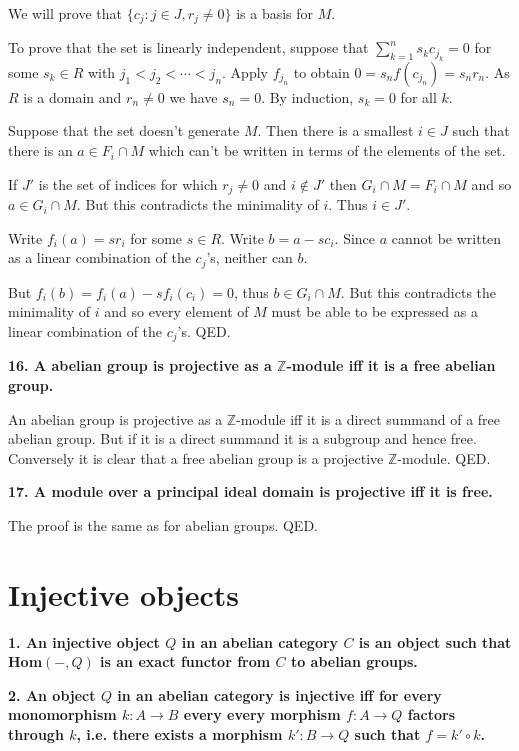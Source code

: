\documentclass[12pt]{article}
\newcommand{\Z}{\mathbb{Z}}
\begin{document}
We will prove that $\{c_j : j \in J, r_j \neq 0\}$ is a basis for $M$.

To prove that the set is linearly independent, suppose that $\sum_{k=1}^n s_kc_{j_k} = 0$ for some $s_k \in R$ with $j_1 < j_2 < \cdots < j_n$. Apply $f_{j_n}$ to obtain $0 = s_nf(c_{j_n}) = s_nr_n$. As $R$ is a domain and $r_n \neq 0$ we have $s_n = 0$. By induction, $s_k = 0$ for all $k$.

Suppose that the set doesn't generate $M$. Then there is a smallest $i \in J$ such that there is an $a \in F_i\cap M$ which can't be written in terms of the elements of the set. 

If $J'$ is the set of indices for which $r_j \neq 0$ and $i \notin J'$ then $G_i\cap M = F_i\cap M$ and so $a \in G_i\cap M$. But this contradicts the minimality of $i$. Thus $i \in J'$.

Write $f_i(a) = sr_i$ for some $s \in R$. Write $b = a - sc_i$. Since $a$ cannot be written as a linear combination of the $c_j$'s, neither can $b$. 

But $f_i(b) = f_i(a) - sf_i(c_i) = 0$, thus $b \in G_i\cap M$. But this contradicts the minimality of $i$ and so every element of $M$ must be able to be expressed as a linear combination of the $c_j$'s. QED.

\textbf{16. A abelian group is projective as a $\Z$-module iff it is a free abelian group.}

An abelian group is projective as a $\Z$-module iff it is a direct summand of a free abelian group. But if it is a direct summand it is a subgroup and hence free. Conversely it is clear that a free abelian group is a projective $\Z$-module. QED.

\textbf{17. A module over a principal ideal domain is projective iff it is free.}

The proof is the same as for abelian groups. QED.

 



\section{Injective objects}

\textbf{1. An injective object $Q$ in an abelian category $C$ is an object such that Hom$(-, Q)$ is an exact functor from $C$ to abelian groups.}

\textbf{2. An object $Q$ in an abelian category is injective iff for every monomorphism $k : A \to B$ every every morphism $f : A \to Q$ factors through $k$, i.e. there exists a morphism $k' : B \to Q$ such that $f = k'\circ k$.}
\end{document}
